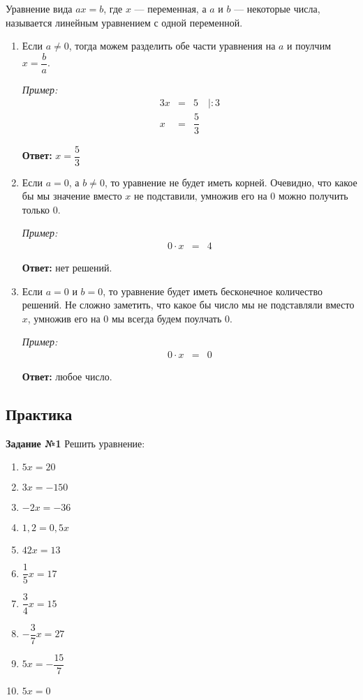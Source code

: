 \documentclass[12pt, a4paper]{article}
\begin{document}
	Уравнение вида $ax=b$, где $x$ — переменная, а $a$ и $b$ — некоторые числа, называется линейным уравнением с одной переменной.
	\begin{enumerate}
		\item Если $a\ne0$, тогда можем разделить обе части уравнения на $a$ и поулчим $x=\dfrac{b}{a}$.
		
		\textit{Пример:}
		\begin{eqnarray*}
			3x &=& 5 \quad |:3 \\
			x &=& \dfrac{5}{3}
		\end{eqnarray*}
	
		\textbf{Ответ:} $x=\dfrac{5}{3}$
	
		\item Если $a=0$, а $b\ne0$, то уравнение не будет иметь корней. Очевидно, что какое бы мы значение вместо $x$ не подставили, умножив его на $0$ можно получить только $0$.
		
		\textit{Пример:}
		\begin{eqnarray*}
			0\cdot x &=& 4
		\end{eqnarray*}
	
		\textbf{Ответ:} нет решений.
		
		\item Если $a=0$ и $b=0$, то уравнение будет иметь бесконечное количество решений. Не сложно заметить, что какое бы число мы не подставляли вместо $x$, умножив его на $0$ мы всегда будем поулчать $0$.
		
		\textit{Пример:}
		\begin{eqnarray*}
			0\cdot x &=& 0
		\end{eqnarray*}
	
		\textbf{Ответ:} любое число.
	\end{enumerate}
		
		\subsection*{Практика}	
		\textbf{Задание №1} Решить уравнение:
		\begin{multicols}{4}
			\begin{enumerate}[label=\asbuk*)]
				\item $5x=20$
				\item $3x=-150$
				\item $-2x=-36$
				\item $1,2=0,5x$
				\item $42x=13$
				\item $\dfrac{1}{5}x=17$
				\item $\dfrac{3}{4}x=15$
				\item $-\dfrac{3}{7}x=27$
				\item $5x=-\dfrac{15}{7}$
				\item $5x=0$
			\end{enumerate}	
		\end{multicols}
		
\end{document}
